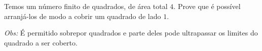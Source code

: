 Temos um número finito de quadrados, de área total $4$.
Prove que é possível arranjá-los de modo a cobrir um quadrado de lado $1$.

\textit{Obs:} É permitido sobrepor quadrados e parte deles pode ultrapassar os limites do quadrado a ser coberto.